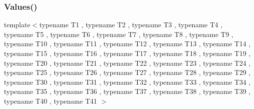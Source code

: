 \mbox{\label{namespacetesting_a51df725741cfcc9539c48885fc2728b0}} 
\subsubsection{\texorpdfstring{Values()}{Values()}\hspace{0.1cm}{\footnotesize\ttfamily [42/51]}}
{\footnotesize\ttfamily template$<$typename T1 , typename T2 , typename T3 , typename T4 , typename T5 , typename T6 , typename T7 , typename T8 , typename T9 , typename T10 , typename T11 , typename T12 , typename T13 , typename T14 , typename T15 , typename T16 , typename T17 , typename T18 , typename T19 , typename T20 , typename T21 , typename T22 , typename T23 , typename T24 , typename T25 , typename T26 , typename T27 , typename T28 , typename T29 , typename T30 , typename T31 , typename T32 , typename T33 , typename T34 , typename T35 , typename T36 , typename T37 , typename T38 , typename T39 , typename T40 , typename T41 $>$ \\
}
